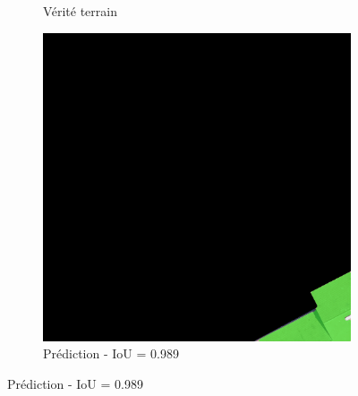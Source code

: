 \begin{figure}[H]
\begin{subfigure}{0.32\textwidth}
    \caption{Vérité terrain}
\end{subfigure}
\hfill
\begin{subfigure}{0.32\textwidth}
    \includegraphics[width=\textwidth]{02-main//figures/ch4/kfold_ensembles/unetplusplus_tu-efficientnetv2_rw_s.ra2_in1k/best_cases/best_5_iou0.989_24931113_tile_13_18_a66e08_overlay_pred.png}
    \caption{Prédiction - IoU = 0.989}
\end{subfigure}

\vspace{0.35cm}


\end{figure}
